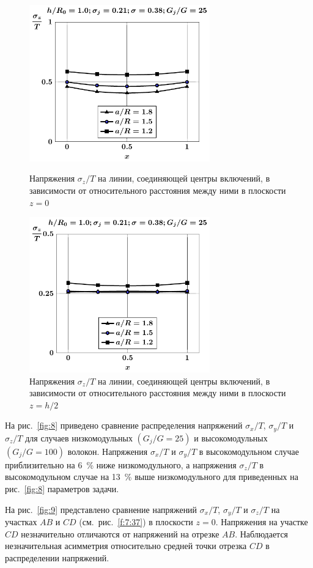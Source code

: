 \begin{figure}[h!]
\centering\footnotesize
\parbox[b]{7.5cm}{\centering\includegraphics[width=7.8cm]{inc16-a-h10-r10-g25-z0-sig-z.pdf}
\caption{Напряжения $\sigma_z/T$ на линии, соединяющей центры включений, в зависимости от относительного расстояния между ними в плоскости $z=0$
\label{fig:6}}}\hfil\hfil
\parbox[b]{7.5cm}{\centering\includegraphics[width=7.8cm]{inc16-a-h10-r10-g25-z1-sig-z.pdf}
\caption{Напряжения $\sigma_z/T$ на линии, соединяющей центры включений, в зависимости от относительного расстояния между ними в плоскости $z=h/2$
\label{fig:7}
}}
\end{figure}

На рис.~\ref{fig:8} приведено сравнение распределения напряжений $\sigma_x/T$, $\sigma_y/T$ и $\sigma_z/T$ для случаев низкомодульных $(G_j/G=25)$ и высокомодульных $(G_j/G=100)$ волокон. Напряжения $\sigma_x/T$ и $\sigma_y/T$ в высокомодульном случае приблизительно на 6~\% ниже низкомодульного, а напряжения $\sigma_z/T$ в высокомодульном случае на 13~\% выше низкомодульного для приведенных на рис.~\ref{fig:8} параметров задачи.

На рис.~\ref{fig:9} представлено сравнение напряжений $\sigma_x/T$, $\sigma_y/T$ и $\sigma_z/T$ на участках $AB$ и $CD$ (см.~рис.~\ref{f:7:37}) в плоскости $z=0$. Напряжения на участке $CD$ незначительно отличаются от напряжений на отрезке $AB$. Наблюдается незначительная асимметрия относительно средней точки отрезка $CD$ в распределении напряжений.

